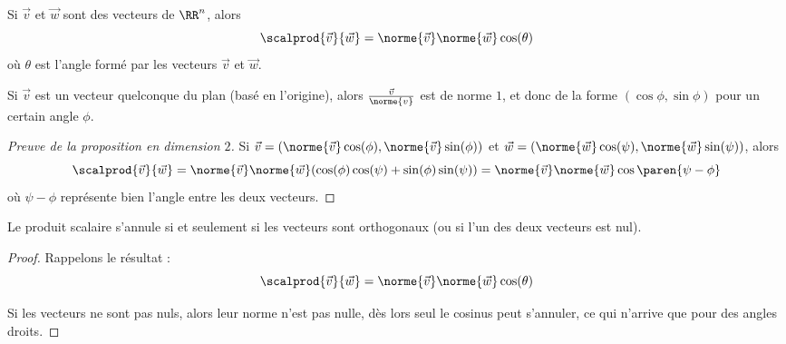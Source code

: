 \begin{frame}
\begin{proposition}
  Si \(\vec v\) et \(\vec w\) sont des vecteurs de \(\RR^{n}\), alors
  \begin{equation*}
    \scalprod{\vec v}{\vec w} = \norme {\vec v}\norme{\vec w} \cos(\theta)
  \end{equation*}
  où \(\theta\) est l'angle formé par les vecteurs \(\vec v\) et \(\vec w\).
\end{proposition}\pause
\begin{remark}
  Si \(\vec{v}\) est un vecteur quelconque du plan (basé en l'origine), alors \(\frac{\vec{v}}{\norme{v}}\) est de norme \(1\), et donc de la forme \((\cos\phi,\sin\phi)\) pour un certain angle \(\phi\).
\end{remark}\pause
\begin{proof}[Preuve de la proposition en dimension \(2\)]
  Si \(\vec v = (\norme {\vec v} \cos(\phi), \norme {\vec v} \sin(\phi))\) et  \(\vec w = (\norme {\vec w} \cos(\psi), \norme {\vec w} \sin(\psi))\), alors 
  \begin{equation*}
    \scalprod{\vec v}{\vec w} = \norme{\vec v}  \norme{\vec w} (\cos(\phi)\cos(\psi) + \sin(\phi)\sin(\psi)) = \norme{\vec v}\norme{\vec w} \cos{\paren{\psi-\phi}}
  \end{equation*}
  où \(\psi-\phi\) représente bien l'angle entre les deux vecteurs.
\end{proof}
\end{frame}

\begin{frame}
  \begin{corollary}
    Le produit scalaire s'annule si et seulement si les vecteurs sont orthogonaux (ou si l'un des deux vecteurs est nul).
  \end{corollary}
  \begin{proof}
    Rappelons le résultat :
    \begin{equation*}
      \scalprod{\vec v}{\vec w} = \norme {\vec v}\norme{\vec w} \cos(\theta)
    \end{equation*}

    Si les vecteurs ne sont pas nuls, alors leur norme n'est pas nulle, dès lors seul le cosinus peut s'annuler, ce qui n'arrive que pour des angles droits.
  \end{proof}
\end{frame}

